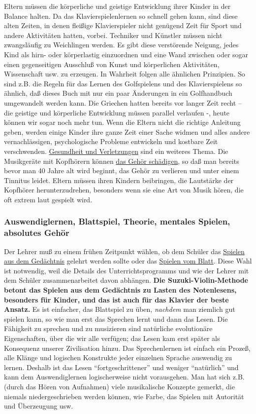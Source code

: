 Eltern müssen die körperliche und geistige Entwicklung ihrer Kinder in der Balance halten.
Da das Klavierspielenlernen so schnell gehen kann, sind diese alten Zeiten, in denen fleißige Klavierspieler nicht genügend Zeit für Sport und andere Aktivitäten hatten, vorbei.
Techniker und Künstler müssen nicht zwangsläufig zu Weichlingen werden.
Es gibt diese verstörende Neigung, jedes Kind als hirn- oder körperlastig einzuordnen und eine Wand zwischen oder sogar einen gegenseitigen Ausschluß von Kunst und körperlichen Aktivitäten, Wissenschaft usw. zu erzeugen.
In Wahrheit folgen alle ähnlichen Prinzipien.
So sind z.B. die Regeln für das Lernen des Golfspielens und des Klavierspielens so ähnlich, daß dieses Buch mit nur ein paar Änderungen in ein Golfhandbuch umgewandelt werden kann.
Die Griechen hatten bereits vor langer Zeit recht -- die geistige und körperliche Entwicklung müssen parallel verlaufen -, heute können wir sogar noch mehr tun.
Wenn die Eltern nicht die richtige Anleitung geben, werden einige Kinder ihre ganze Zeit einer Sache widmen und alles andere vernachlässigen, psychologische Probleme entwickeln und kostbare Zeit verschwenden.
\hyperref[c1iii10krank]{Gesundheit und Verletzungen} sind ein weiteres Thema.
Die Musikgeräte mit Kopfhörern können \hyperref[c1iii10gehoer]{das Gehör schädigen}, so daß man bereits bevor man 40 Jahre alt wird beginnt, das Gehör zu verlieren und unter einem Tinnitus leidet.
Eltern müssen ihren Kindern beibringen, die Lautstärke der Kopfhörer herunterzudrehen, besonders wenn sie eine Art von Musik hören, die oft extrem laut gespielt wird.
 

\subsubsection{Auswendiglernen, Blattspiel, Theorie, mentales Spielen, absolutes Gehör}
\label{c1iii16c}

Der Lehrer muß zu einem frühen Zeitpunkt wählen, ob dem Schüler das \hyperref[c1iii6]{Spielen aus dem Gedächtnis} gelehrt werden sollte oder das \hyperref[c1iii11]{Spielen vom Blatt}.
Diese Wahl ist notwendig, weil die Details des Unterrichtsprogramms und wie der Lehrer mit dem Schüler zusammenarbeitet davon abhängen.
\textbf{Die Suzuki-Violin-Methode betont das Spielen aus dem Gedächtnis zu Lasten des Notenlesens, besonders für Kinder, und das ist auch für das Klavier der beste Ansatz.}
Es ist einfacher, das Blattspiel zu üben, \textit{nachdem} man ziemlich gut spielen kann,
so wie man erst das Sprechen lernt und dann das Lesen.
Die Fähigkeit zu sprechen und zu musizieren sind natürliche evolutionäre Eigenschaften, über die wir alle verfügen; das Lesen kam erst später als Konsequenz unserer Zivilisation hinzu.
Das Sprechenlernen ist einfach ein Prozeß, alle Klänge und logischen Konstrukte jeder einzelnen Sprache auswendig zu lernen.
Deshalb ist das Lesen \enquote{fortgeschrittener} und weniger \enquote{natürlich} und kann dem Auswendiglernen logischerweise nicht vorausgehen.
Man hat sich z.B. (durch das Hören von Aufnahmen) viele musikalische Konzepte gemerkt, die niemals niedergeschrieben werden können, wie Farbe, das Spielen mit Autorität und Überzeugung usw.

